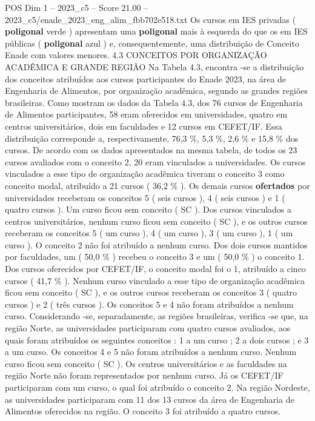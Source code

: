 \begin{textsample}{POS Dim 1 – 2023\_c5 – Score 21.00 – 2023\_c5/enade\_2023\_eng\_alim\_fbb702e518.txt}
Os cursos em IES privadas ( \textbf{poligonal} verde ) apresentam uma \textbf{poligonal} mais à esquerda do que os em IES públicas ( \textbf{poligonal} azul ) e, consequentemente, uma distribuição de Conceito Enade com valores menores. 4.3 CONCEITOS POR ORGANIZAÇÃO ACADÊMICA E GRANDE REGIÃO Na Tabela 4.3, encontra -se a distribuição dos conceitos atribuídos aos cursos participantes do Enade 2023, na área de Engenharia de Alimentos, por organização acadêmica, segundo as grandes regiões brasileiras.
Como mostram os dados da Tabela 4.3, dos 76 cursos de Engenharia de Alimentos participantes, 58 eram oferecidos em universidades, quatro em centros universitários, dois em faculdades e 12 cursos em CEFET/IF.
Essa distribuição corresponde a, respectivamente, 76,3 \%, 5,3 \%, 2,6 \% e 15,8 \% dos cursos.
De acordo com os dados apresentados na mesma tabela, de todos os 23 cursos avaliados com o conceito 2, 20 eram vinculados a universidades.
Os cursos vinculados a esse tipo de organização acadêmica tiveram o conceito 3 como conceito modal, atribuído a 21 cursos ( 36,2 \% ).
Os demais cursos \textbf{ofertados} por universidades receberam os conceitos 5 ( seis cursos ), 4 ( seis cursos ) e 1 ( quatro cursos ).
Um curso ficou sem conceito ( SC ).
Dos cursos vinculados a centros universitários, nenhum curso ficou sem conceito ( SC ), e os outros cursos receberam os conceitos 5 ( um curso ), 4 ( um curso ), 3 ( um curso ), 1 ( um curso ).
O conceito 2 não foi atribuído a nenhum curso.
Dos dois cursos mantidos por faculdades, um ( 50,0 \% ) recebeu o conceito 3 e um ( 50,0 \% ) o conceito 1.
Dos cursos oferecidos por CEFET/IF, o conceito modal foi o 1, atribuído a cinco cursos ( 41,7 \% ).
Nenhum curso vinculado a esse tipo de organização acadêmica ficou sem conceito ( SC ), e os outros cursos receberam os conceitos 3 ( quatro cursos ) e 2 ( três cursos ).
Os conceitos 5 e 4 não foram atribuídos a nenhum curso.
Considerando -se, separadamente, as regiões brasileiras, verifica -se que, na região Norte, as universidades participaram com quatro cursos avaliados, aos quais foram atribuídos os seguintes conceitos : 1 a um curso ; 2 a dois cursos ; e 3 a um curso.
Os conceitos 4 e 5 não foram atribuídos a nenhum curso.
Nenhum curso ficou sem conceito ( SC ).
Os centros universitários e as faculdades na região Norte não foram representados por nenhum curso.
Já os CEFET/IF participaram com um curso, o qual foi atribuído o conceito 2.
Na região Nordeste, as universidades participaram com 11 dos 13 cursos da área de Engenharia de Alimentos oferecidos na região.
O conceito 3 foi atribuído a quatro cursos.

\end{textsample}
